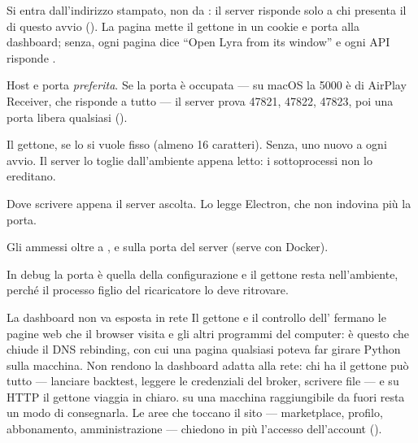 \noindent
Si entra dall'indirizzo stampato, non da : il
server risponde solo a chi presenta il  di questo avvio
(). La pagina  mette il
gettone in un cookie e porta alla dashboard; senza, ogni pagina dice
\enquote{Open Lyra from its window} e ogni API risponde .

\begin{description}[leftmargin = 1.4em, style = nextline, itemsep = 4pt]
  \item[\cod{FLASK\_HOST}, \cod{FLASK\_PORT}] Host e porta \emph{preferita}.
    Se la porta è occupata --- su macOS la \num{5000} è di AirPlay Receiver,
    che risponde  a tutto --- il server prova \num{47821},
    \num{47822}, \num{47823}, poi una porta libera qualsiasi
    ().
  \item[\cod{LYRA\_TOKEN}] Il gettone, se lo si vuole fisso (almeno
    \num{16} caratteri). Senza, uno nuovo a ogni avvio. Il server lo toglie
    dall'ambiente appena letto: i sottoprocessi non lo ereditano.
  \item[\cod{LYRA\_RUNTIME\_FILE}] Dove scrivere 
    appena il server ascolta. Lo legge Electron, che non indovina più la
    porta.
  \item[\cod{LYRA\_ALLOWED\_HOSTS}] Gli  ammessi oltre a
    ,  e \cod{[::1]} sulla porta del server
    (serve con Docker).
  \item[\cod{FLASK\_DEBUG}] In debug la porta è quella della configurazione
    e il gettone resta nell'ambiente, perché il processo figlio del
    ricaricatore lo deve ritrovare.
\end{description}

\begin{attenzione}{La dashboard non va esposta in rete}
Il gettone e il controllo dell' fermano le pagine web che il
browser visita e gli altri programmi del computer: è questo che chiude il
DNS rebinding, con cui una pagina qualsiasi poteva far girare Python sulla
macchina. Non rendono la dashboard adatta alla rete: chi ha il gettone può
tutto --- lanciare backtest, leggere le credenziali del broker, scrivere
file --- e su HTTP il gettone viaggia in chiaro.  su
una macchina raggiungibile da fuori resta un modo di consegnarla. Le aree che
toccano il sito --- marketplace, profilo, abbonamento, amministrazione ---
chiedono in più l'accesso dell'account ().
\end{attenzione}

